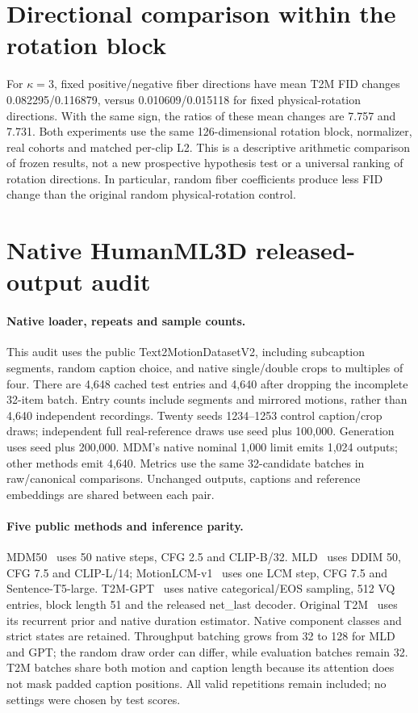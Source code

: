 \documentclass[10pt,twocolumn,letterpaper]{article}
\begin{document}
\section{Directional comparison within the rotation block}
For $\kappa=3$, fixed positive/negative fiber directions have mean T2M FID changes 0.082295/0.116879, versus 0.010609/0.015118 for fixed physical-rotation directions. With the same sign, the ratios of these mean changes are 7.757 and 7.731. Both experiments use the same 126-dimensional rotation block, normalizer, real cohorts and matched per-clip L2. This is a descriptive arithmetic comparison of frozen results, not a new prospective hypothesis test or a universal ranking of rotation directions. In particular, random fiber coefficients produce less FID change than the original random physical-rotation control.



\section{Native HumanML3D released-output audit}
\paragraph{Native loader, repeats and sample counts.}
This audit uses the public Text2MotionDatasetV2, including subcaption segments, random caption choice, and native single/double crops to multiples of four. There are 4,648 cached test entries and 4,640 after dropping the incomplete 32-item batch. Entry counts include segments and mirrored motions, rather than 4,640 independent recordings. Twenty seeds 1234--1253 control caption/crop draws; independent full real-reference draws use seed plus 100,000. Generation uses seed plus 200,000. MDM's native nominal 1,000 limit emits 1,024 outputs; other methods emit 4,640. Metrics use the same 32-candidate batches in raw/canonical comparisons. Unchanged outputs, captions and reference embeddings are shared between each pair.

\paragraph{Five public methods and inference parity.}
MDM50~\cite{tevet2023} uses 50 native steps, CFG 2.5 and CLIP-B/32. MLD~\cite{mld2023} uses DDIM 50, CFG 7.5 and CLIP-L/14; MotionLCM-v1~\cite{motionlcm2024} uses one LCM step, CFG 7.5 and Sentence-T5-large. T2M-GPT~\cite{t2mgpt2023} uses native categorical/EOS sampling, 512 VQ entries, block length 51 and the released net\_last decoder. Original T2M~\cite{guo2022} uses its recurrent prior and native duration estimator. Native component classes and strict states are retained. Throughput batching grows from 32 to 128 for MLD and GPT; the random draw order can differ, while evaluation batches remain 32. T2M batches share both motion and caption length because its attention does not mask padded caption positions. All valid repetitions remain included; no settings were chosen by test scores.
\end{document}
